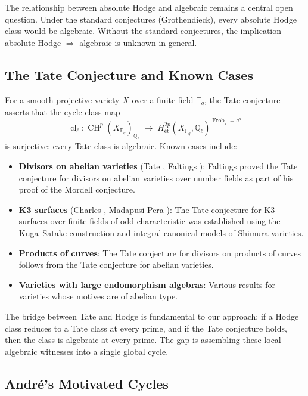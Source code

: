 \documentclass[11pt]{article}
\theoremstyle{definition}
\DeclareMathOperator{\cl}{cl}
\DeclareMathOperator{\Frob}{Frob}
\DeclareMathOperator{\CH}{CH}
\begin{document}
The relationship between absolute Hodge and algebraic remains a central open
question.  Under the standard conjectures (Grothendieck), every absolute Hodge
class would be algebraic.  Without the standard conjectures, the implication
absolute Hodge $\Rightarrow$ algebraic is unknown in general.

\subsection{The Tate Conjecture and Known Cases}

For a smooth projective variety $X$ over a finite field $\mathbb{F}_q$, the
Tate conjecture asserts that the cycle class map
\[
  \cl_\ell : \CH^p(X_{\mathbb{F}_q})_{\mathbb{Q}_\ell}
  \;\longrightarrow\;
  H^{2p}_{\text{\'et}}(X_{\bar{\mathbb{F}}_q}, \mathbb{Q}_\ell)^{\Frob_q = q^p}
\]
is surjective: every Tate class is algebraic.  Known cases include:

\begin{itemize}
  \item \textbf{Divisors on abelian varieties} (Tate \cite{Tate}, Faltings
    \cite{Faltings}): Faltings proved the Tate conjecture for divisors on
    abelian varieties over number fields as part of his proof of the Mordell
    conjecture.
  \item \textbf{K3 surfaces} (Charles \cite{Charles}, Madapusi Pera
    \cite{MP}): The Tate conjecture for K3 surfaces over finite fields of
    odd characteristic was established using the Kuga--Satake construction
    and integral canonical models of Shimura varieties.
  \item \textbf{Products of curves}: The Tate conjecture for divisors on
    products of curves follows from the Tate conjecture for abelian varieties.
  \item \textbf{Varieties with large endomorphism algebras}: Various results
    for varieties whose motives are of abelian type.
\end{itemize}

The bridge between Tate and Hodge is fundamental to our approach: if a Hodge
class reduces to a Tate class at every prime, and if the Tate conjecture holds,
then the class is algebraic at every prime.  The gap is assembling these
local algebraic witnesses into a single global cycle.

\subsection{Andr\'e's Motivated Cycles}
\end{document}
